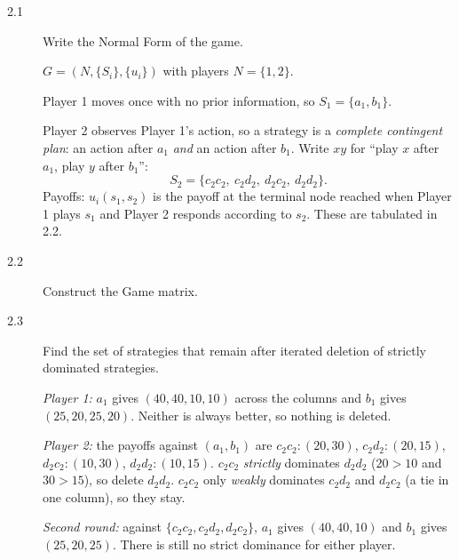 \begin{description}
\item[2.1] Write the Normal Form of the game.
\begin{solution}
$G=(N,\{S_i\},\{u_i\})$ with players $N=\{1,2\}$.

Player 1 moves once with no prior information, so $S_1=\{a_1,b_1\}$.

Player 2 observes Player 1's action, so a strategy is a \emph{complete contingent plan}: an action after $a_1$ \emph{and} an action after $b_1$. Write $xy$ for ``play $x$ after $a_1$, play $y$ after $b_1$'':
\[S_2=\{c_2c_2,\ c_2d_2,\ d_2c_2,\ d_2d_2\}.\]
Payoffs: $u_i(s_1,s_2)$ is the payoff at the terminal node reached when Player 1 plays $s_1$ and Player 2 responds according to $s_2$. These are tabulated in 2.2.
\end{solution}
\item[2.2] Construct the Game matrix.
\begin{solution}
\end{solution}
\item[2.3] Find the set of strategies that remain after iterated deletion of strictly dominated strategies.
\begin{solution}
\emph{Player 1:} $a_1$ gives $(40,40,10,10)$ across the columns and $b_1$ gives $(25,20,25,20)$. Neither is always better, so nothing is deleted.

\emph{Player 2:} the payoffs against $(a_1,b_1)$ are $c_2c_2:(20,30)$, $c_2d_2:(20,15)$, $d_2c_2:(10,30)$, $d_2d_2:(10,15)$. $c_2c_2$ \emph{strictly} dominates $d_2d_2$ ($20>10$ and $30>15$), so delete $d_2d_2$. $c_2c_2$ only \emph{weakly} dominates $c_2d_2$ and $d_2c_2$ (a tie in one column), so they stay.

\emph{Second round:} against $\{c_2c_2,c_2d_2,d_2c_2\}$, $a_1$ gives $(40,40,10)$ and $b_1$ gives $(25,20,25)$. There is still no strict dominance for either player.


\end{solution}
\end{description}
